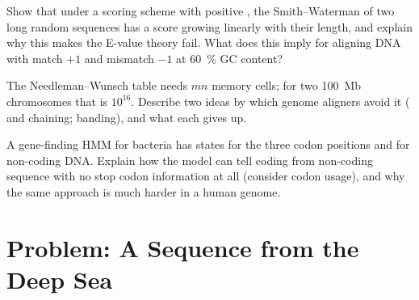 \begin{exercise}[$\star\star\star$]\label{exo:b3:bioinformatics:10}
Show that under a scoring scheme with positive , the
Smith--Waterman  of two long random sequences has a
score growing linearly with their length, and explain why this makes
the E-value theory fail. What does this imply for aligning DNA with
match $+1$ and mismatch $-1$ at \qty{60}{\%} GC content?
\end{exercise}

\begin{exercise}[$\star\star\star$]\label{exo:b3:bioinformatics:11}
The Needleman--Wunsch table needs $mn$ memory cells; for two
\qty{100}{Mb} chromosomes that is $10^{16}$. Describe two ideas by which
genome aligners avoid it ( and chaining; banding), and what each
gives up.
\end{exercise}

\begin{exercise}[$\star\star\star$]\label{exo:b3:bioinformatics:12}
A gene-finding HMM for bacteria has states for the three codon
positions and for non-coding DNA. Explain how the model can tell
coding from non-coding sequence with no stop codon information at all
(consider codon usage), and why the same approach is much harder in a
human genome.
\end{exercise}

\section{Problem: A Sequence from the Deep Sea}

